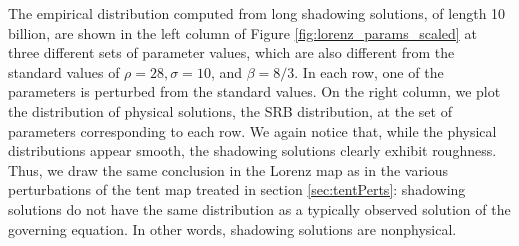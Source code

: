 The empirical distribution computed from long shadowing solutions, of length 10 billion, are shown in the left column of Figure \ref{fig:lorenz_params_scaled} at three different sets of parameter values, which are also different from the standard values of $\rho = 28, \sigma = 10$, and $\beta = 8/3$. 
In each row, one of the parameters is perturbed from the standard values. On the right column, we plot the distribution of physical solutions, the SRB distribution, at the set of parameters corresponding to each row. We again notice that, while the physical distributions appear smooth, the shadowing solutions clearly exhibit roughness. Thus, we draw the same conclusion in the Lorenz map as in the various perturbations of the tent map treated in section \ref{sec:tentPerts}: shadowing solutions do not have the same distribution as a typically observed solution of the governing equation. In other words, shadowing solutions are nonphysical.


